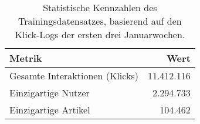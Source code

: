 
\begin{table}[htbp]
    \centering
    \caption{Statistische Kennzahlen des Trainingsdatensatzes, basierend auf den Klick-Logs der ersten drei Januarwochen.}
    \label{tab:statistiken_training}
    \begin{tabular}{lr}
        \toprule
        \textbf{Metrik} & \textbf{Wert} \\
        \midrule
        Gesamte Interaktionen (Klicks) & 11.412.116 \\
        Einzigartige Nutzer & 2.294.733 \\
        Einzigartige Artikel & 104.462 \\
        \bottomrule
    \end{tabular}
\end{table}